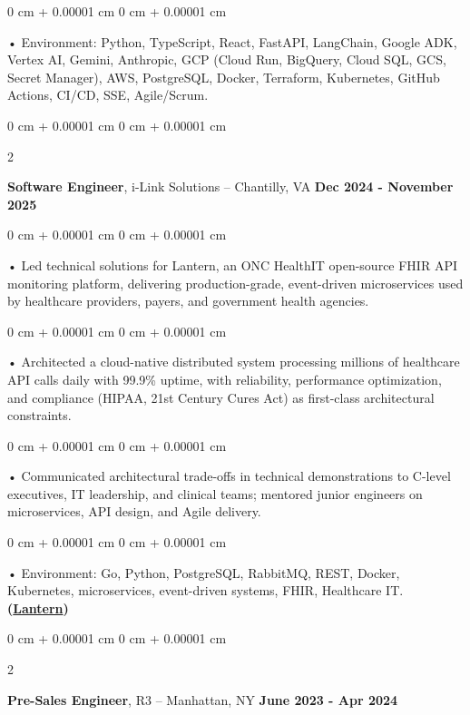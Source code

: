 \documentclass[10pt, letterpaper]{article}
\newenvironment{onecolentry}{
    \begin{adjustwidth}{
        0 cm + 0.00001 cm
    }{
        0 cm + 0.00001 cm
    }
}{
    \end{adjustwidth}
} %
\newenvironment{twocolentry}[2][]{
    \onecolentry
    \def\secondColumn{#2}
    \setcolumnwidth{\fill, 4.5 cm}
    \begin{paracol}{2}
}{
    \switchcolumn \raggedleft \secondColumn
    \end{paracol}
    \endonecolentry
} %
\begin{document}
        \begin{onecolentry}
             • Environment: Python, TypeScript, React, FastAPI, LangChain, Google ADK, Vertex AI, Gemini, Anthropic, GCP (Cloud Run, BigQuery, Cloud SQL, GCS, Secret Manager), AWS, PostgreSQL, Docker, Terraform, Kubernetes, GitHub Actions, CI/CD, SSE, Agile/Scrum.
        \end{onecolentry}

        \vspace{0.1cm}

        \begin{twocolentry}{
            \textbf{Dec 2024 - November 2025}
        }
            \textbf{Software Engineer}, i-Link Solutions -- Chantilly, VA\end{twocolentry}


        \begin{onecolentry}
             • Led technical solutions for Lantern, an ONC HealthIT open-source FHIR API monitoring platform, delivering production-grade, event-driven microservices used by healthcare providers, payers, and government health agencies.
        \end{onecolentry}
        \begin{onecolentry}
             • Architected a cloud-native distributed system processing millions of healthcare API calls daily with 99.9\% uptime, with reliability, performance optimization, and compliance (HIPAA, 21st Century Cures Act) as first-class architectural constraints.
        \end{onecolentry}
        \begin{onecolentry}
             • Communicated architectural trade-offs in technical demonstrations to C-level executives, IT leadership, and clinical teams; mentored junior engineers on microservices, API design, and Agile delivery.
        \end{onecolentry}

        \begin{onecolentry}
             • Environment: Go, Python, PostgreSQL, RabbitMQ, REST, Docker, Kubernetes, microservices, event-driven systems, FHIR, Healthcare IT. \textbf{(\href{https://lantern.healthit.gov/?tab=dashboard_tab}{Lantern})}
        \end{onecolentry}
        \vspace{0.1cm}

        \begin{twocolentry}{
            \textbf{June 2023 - Apr 2024}
        }
            \textbf{Pre-Sales Engineer}, R3 -- Manhattan, NY\end{twocolentry}
\end{document}
